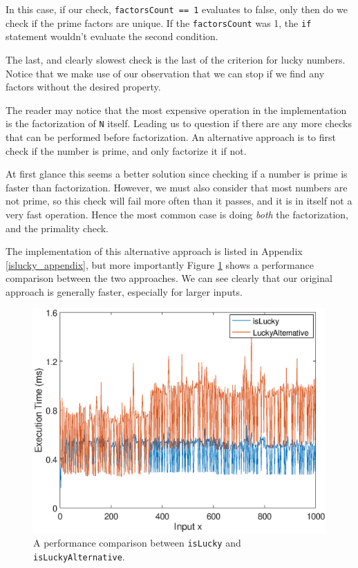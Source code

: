 \documentclass[10pt]{article}
\begin{document}
In this case, if our check, \texttt{factorsCount == 1} evaluates to false, only then do we check if the prime factors are unique. If the \texttt{factorsCount} was 1, the \texttt{if} statement wouldn't evaluate the second condition.

The last, and clearly slowest check is the last  of the criterion for lucky numbers. Notice that we make use of our observation that we can stop if we find any factors without the desired property.

The reader may notice that the most expensive operation in the implementation is the factorization of \texttt{N} itself. Leading us to question if there are any more checks that can be performed before factorization. An alternative approach is to first check if the number is prime, and only factorize it if not.

At first glance this seems a better solution since checking if a number is prime is faster than factorization. However, we must also consider that most numbers are not prime, so this check will fail more often than it passes, and it is in itself not a very fast operation. Hence the most common case is doing \emph{both} the factorization, and the primality check.


The implementation of this alternative approach is listed in Appendix \ref{islucky_appendix}, but more importantly Figure \ref{isluckytest} shows a performance comparison between the two approaches. We can see clearly that our original approach is generally faster, especially for larger inputs.


\begin{figure}[h]

   \includegraphics[scale=0.5]{islucky_test.eps}

   \caption{A performance comparison between \texttt{isLucky} and \texttt{isLuckyAlternative}.}
      \label{isluckytest}
\end{figure}
\end{document}
